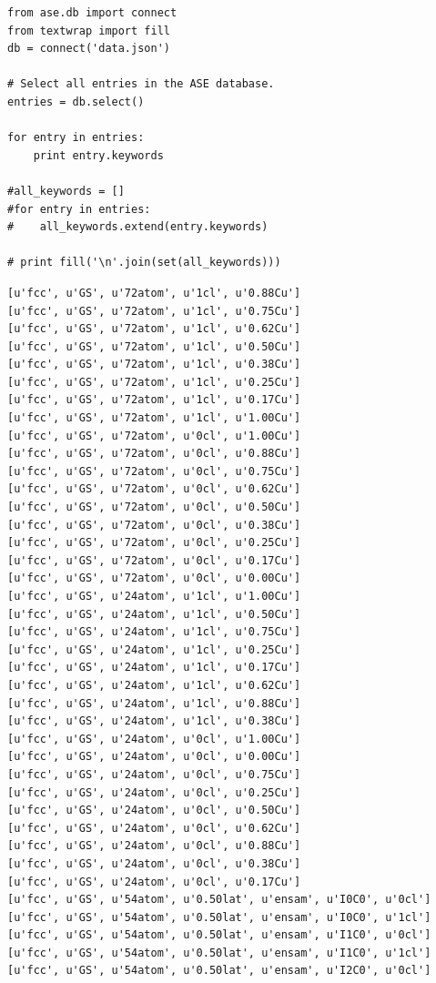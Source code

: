 \documentclass[number, sort&compress, review, 12pt]{elsarticle}
\begin{document}
\begin{verbatim}
from ase.db import connect
from textwrap import fill
db = connect('data.json')

# Select all entries in the ASE database.
entries = db.select()

for entry in entries:
    print entry.keywords

#all_keywords = []
#for entry in entries:
#    all_keywords.extend(entry.keywords)

# print fill('\n'.join(set(all_keywords)))
\end{verbatim}

\begin{verbatim}
[u'fcc', u'GS', u'72atom', u'1cl', u'0.88Cu']
[u'fcc', u'GS', u'72atom', u'1cl', u'0.75Cu']
[u'fcc', u'GS', u'72atom', u'1cl', u'0.62Cu']
[u'fcc', u'GS', u'72atom', u'1cl', u'0.50Cu']
[u'fcc', u'GS', u'72atom', u'1cl', u'0.38Cu']
[u'fcc', u'GS', u'72atom', u'1cl', u'0.25Cu']
[u'fcc', u'GS', u'72atom', u'1cl', u'0.17Cu']
[u'fcc', u'GS', u'72atom', u'1cl', u'1.00Cu']
[u'fcc', u'GS', u'72atom', u'0cl', u'1.00Cu']
[u'fcc', u'GS', u'72atom', u'0cl', u'0.88Cu']
[u'fcc', u'GS', u'72atom', u'0cl', u'0.75Cu']
[u'fcc', u'GS', u'72atom', u'0cl', u'0.62Cu']
[u'fcc', u'GS', u'72atom', u'0cl', u'0.50Cu']
[u'fcc', u'GS', u'72atom', u'0cl', u'0.38Cu']
[u'fcc', u'GS', u'72atom', u'0cl', u'0.25Cu']
[u'fcc', u'GS', u'72atom', u'0cl', u'0.17Cu']
[u'fcc', u'GS', u'72atom', u'0cl', u'0.00Cu']
[u'fcc', u'GS', u'24atom', u'1cl', u'1.00Cu']
[u'fcc', u'GS', u'24atom', u'1cl', u'0.50Cu']
[u'fcc', u'GS', u'24atom', u'1cl', u'0.75Cu']
[u'fcc', u'GS', u'24atom', u'1cl', u'0.25Cu']
[u'fcc', u'GS', u'24atom', u'1cl', u'0.17Cu']
[u'fcc', u'GS', u'24atom', u'1cl', u'0.62Cu']
[u'fcc', u'GS', u'24atom', u'1cl', u'0.88Cu']
[u'fcc', u'GS', u'24atom', u'1cl', u'0.38Cu']
[u'fcc', u'GS', u'24atom', u'0cl', u'1.00Cu']
[u'fcc', u'GS', u'24atom', u'0cl', u'0.00Cu']
[u'fcc', u'GS', u'24atom', u'0cl', u'0.75Cu']
[u'fcc', u'GS', u'24atom', u'0cl', u'0.25Cu']
[u'fcc', u'GS', u'24atom', u'0cl', u'0.50Cu']
[u'fcc', u'GS', u'24atom', u'0cl', u'0.62Cu']
[u'fcc', u'GS', u'24atom', u'0cl', u'0.88Cu']
[u'fcc', u'GS', u'24atom', u'0cl', u'0.38Cu']
[u'fcc', u'GS', u'24atom', u'0cl', u'0.17Cu']
[u'fcc', u'GS', u'54atom', u'0.50lat', u'ensam', u'I0C0', u'0cl']
[u'fcc', u'GS', u'54atom', u'0.50lat', u'ensam', u'I0C0', u'1cl']
[u'fcc', u'GS', u'54atom', u'0.50lat', u'ensam', u'I1C0', u'0cl']
[u'fcc', u'GS', u'54atom', u'0.50lat', u'ensam', u'I1C0', u'1cl']
[u'fcc', u'GS', u'54atom', u'0.50lat', u'ensam', u'I2C0', u'0cl']

\end{verbatim}
\end{document}
